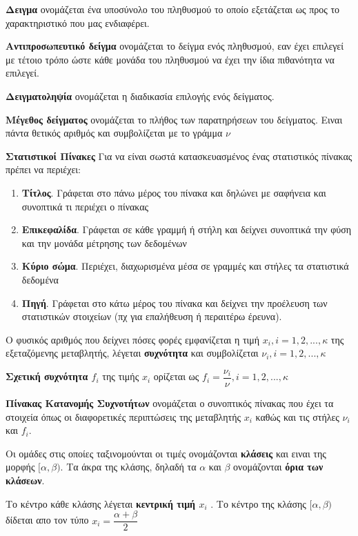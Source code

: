 \documentclass[a4paper,12pt]{article}                      %
\begin{document}
\begin{multicols}{2}
\textbf{Δειγμα} ονομάζεται ένα υποσύνολο του πληθυσμού το οποίο εξετάζεται ως προς το χαρακτηριστικό που μας ενδιαφέρει.

\textbf{Αντιπροσωπευτικό δείγμα} ονομάζεται το δείγμα ενός πληθυσμού, εαν έχει επιλεγεί με τέτοιο τρόπο ώστε κάθε μονάδα του πληθυσμού να έχει την ίδια πιθανότητα να επιλεγεί.

\textbf{Δειγματοληψία} ονομάζεται η διαδικασία επιλογής ενός δείγματος.

\textbf{Μέγεθος δείγματος} ονομάζεται το πλήθος των παρατηρήσεων του δείγματος. Ειναι πάντα θετικός αριθμός και συμβολίζεται με το γράμμα $ \nu $

\textbf{Στατιστικοί Πίνακες}
Για να είναι σωστά κατασκευασμένος ένας στατιστικός πίνακας πρέπει να περιέχει:
\begin{enumerate}
\item \textbf{Τίτλος}. Γράφεται στο πάνω μέρος του πίνακα και δηλώνει με σαφήνεια και συνοπτικά τι περιέχει ο πίνακας
\item \textbf{Επικεφαλίδα}. Γράφεται σε κάθε γραμμή ή στήλη και δείχνει συνοπτικά την φύση και την μονάδα μέτρησης των δεδομένων
\item \textbf{Κύριο σώμα}. Περιέχει, διαχωρισμένα μέσα σε γραμμές και στήλες τα στατιστικά δεδομένα
\item \textbf{Πηγή}. Γράφεται στο κάτω μέρος του πίνακα και δείχνει την προέλευση των στατιστικών στοιχείων (πχ για επαλήθευση ή περαιτέρω έρευνα).
\end{enumerate}

Ο φυσικός αριθμός που δείχνει πόσες φορές εμφανίζεται η τιμή $ x_i, i=1,2,...,\kappa $ της εξεταζόμενης μεταβλητής, λέγεται \textbf{συχνότητα} και συμβολίζεται $ \nu_i, i=1,2,...,\kappa $

\textbf{Σχετική συχνότητα $ f_i $ } της τιμής $ x_i $ ορίζεται ως $ f_i=\dfrac{\nu_i}{\nu}, i=1,2,...,\kappa $ 

\textbf{Πίνακας Κατανομής Συχνοτήτων} ονομάζεται ο συνοπτικός πίνακας που έχει τα στοιχεία όπως οι διαφορετικές περιπτώσεις της μεταβλητής $ x_i $ καθώς και τις στήλες $ \nu_i $ και $ f_i $.

Οι ομάδες στις οποίες ταξινομούνται οι τιμές ονομάζονται \textbf{κλάσεις} και ειναι της μορφής $ [\alpha,\beta) $. Τα άκρα της κλάσης, δηλαδή τα $\alpha$ και $\beta$ ονομάζονται \textbf{όρια των κλάσεων}.

Το κέντρο κάθε κλάσης λέγεται \textbf{κεντρική τιμή $x_i$ }. Το κέντρο της κλάσης $[\alpha,\beta) $ δίδεται απο τον τύπο $ x_i=\dfrac{\alpha+\beta}{2} $


\end{multicols}
\end{document}
